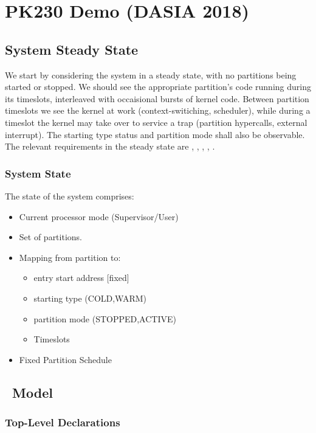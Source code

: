 \chapter{PK230 Demo (DASIA 2018)}

\section{System Steady State}

We start by considering the system in a steady state,
with no partitions being started or stopped.
We should see the appropriate partition's code running
during its timeslots,
interleaved with occaisional bursts of kernel code.
Between partition timeslots we see the kernel at work
(context-switiching, scheduler),
while during a timeslot the kernel may take over to service
a trap (partition hypercalls, external interrupt).
The starting type status and partition mode shall also be observable.
The relevant requirements in the steady state are
, , , , .


\subsection{System State}

The state of the system comprises:
\begin{itemize}
  \item Current processor mode (Supervisor/User)
  \item Set of partitions.
  \item Mapping from partition to:
    \begin{itemize}
      \item entry start address [fixed]
      \item starting type (COLD,WARM)
      \item partition mode (STOPPED,ACTIVE)
      \item Timeslots
    \end{itemize}
  \item Fixed Partition Schedule
\end{itemize}

\section{\Circus\ Model}

\subsection{Top-Level Declarations}

